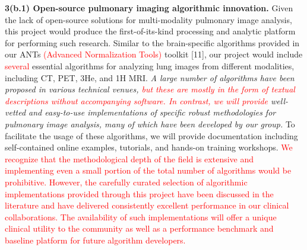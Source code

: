 \documentclass[11pt,]{article}
\begin{document}
\textbf{3(b.1) Open-source pulmonary imaging algorithmic innovation.}
Given the lack of open-source solutions for multi-modality pulmonary
image analysis, this project would produce the first-of-its-kind
processing and analytic platform for performing such research. Similar
to the brain-specific algorithms provided in our ANTs
\textcolor{red}{(Advanced Normalization Tools)} toolkit {[}11{]}, our
project would include \textcolor{red}{several} essential algorithms for
analyzing lung images from different modalities, including CT, PET, 3He,
and 1H MRI. \emph{A large number of algorithms have been proposed in
various technical venues,
\textcolor{red}{but these are mostly in the form of
textual descriptions without accompanying software.}
\textcolor{red}{In contrast, we will provide} well-vetted and
easy-to-use implementations of specific robust methodologies for
pulmonary image analysis, many of which have been developed by our
group.} To facilitate the usage of these algorithms, we will provide
documentation including self-contained online examples, tutorials, and
hands-on training workshops.
\textcolor{red}{We recognize that the methodological depth of the field is extensive
and implementing even a small portion of the total number of algorithms would be
prohibitive.}
\textcolor{red}{However, the carefully curated selection of
algorithmic implementations provided through this
project have been discussed in the literature and have delivered consistently
excellent performance in our
clinical collaborations.  The availability of such implementations will offer a
unique clinical utility to the community as well as a performance benchmark
and baseline platform for future
algorithm developers.}
\end{document}

